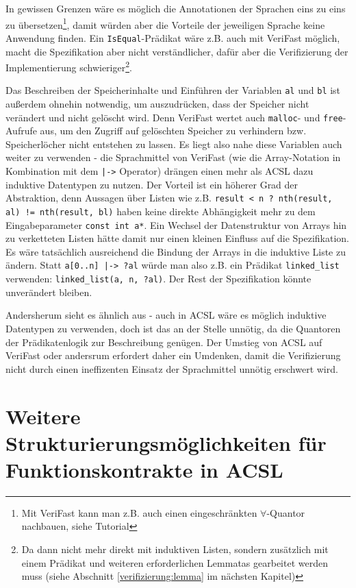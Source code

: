 In gewissen Grenzen wäre es möglich die Annotationen der Sprachen eins zu eins zu übersetzen\footnote{Mit
VeriFast kann man z.B. auch einen eingeschränkten \(\forall\)-Quantor nachbauen, siehe Tutorial\cite[Kap. 17]{jacobs-tutorial}},
damit würden aber die Vorteile der jeweiligen Sprache keine Anwendung finden. Ein \lstinline{IsEqual}-Prädikat wäre z.B.
auch mit VeriFast möglich, macht die Spezifikation aber nicht verständlicher, dafür aber die Verifizierung
der Implementierung schwieriger\footnote{Da dann nicht mehr direkt mit induktiven Listen, sondern zusätzlich
mit einem Prädikat und weiteren erforderlichen Lemmatas gearbeitet werden muss (siehe Abschnitt
\ref{verifizierung:lemma} im nächsten Kapitel)}.

Das Beschreiben der Speicherinhalte und Einführen der Variablen  \lstinline{al} und \lstinline{bl} ist außerdem
ohnehin notwendig, um auszudrücken, dass der Speicher nicht verändert und nicht gelöscht wird. Denn VeriFast wertet
auch \lstinline{malloc}- und \lstinline{free}-Aufrufe aus, um den Zugriff auf gelöschten Speicher zu verhindern bzw.
Speicherlöcher nicht entstehen zu lassen.
Es liegt also nahe diese Variablen auch weiter zu verwenden - die Sprachmittel von VeriFast (wie die Array-Notation in Kombination mit dem
\lstinline{|->} Operator) drängen einen mehr als ACSL dazu induktive Datentypen zu nutzen.
Der Vorteil ist ein höherer Grad der Abstraktion, denn Aussagen über Listen wie z.B.
\lstinline{result < n ? nth(result, al) != nth(result, bl)} haben keine direkte Abhängigkeit mehr zu
dem Eingabeparameter \lstinline{const int a*}. Ein Wechsel der Datenstruktur von Arrays
hin zu verketteten Listen hätte damit nur einen kleinen Einfluss auf die Spezifikation. Es wäre tatsächlich 
ausreichend die Bindung der Arrays in die induktive Liste zu ändern. Statt \lstinline{a[0..n] |-> ?al} würde man also
z.B. ein Prädikat \lstinline{linked_list} verwenden: \lstinline{linked_list(a, n, ?al)}. Der Rest der 
Spezifikation könnte unverändert bleiben.

Andersherum sieht es ähnlich aus - auch in ACSL wäre es möglich induktive Datentypen zu verwenden, doch
ist das an der Stelle unnötig, da die Quantoren der Prädikatenlogik zur Beschreibung genügen. 
Der Umstieg von ACSL auf VeriFast oder andersrum erfordert daher ein Umdenken, damit die Verifizierung 
nicht durch einen ineffizenten Einsatz der Sprachmittel unnötig erschwert wird.



\section{Weitere Strukturierungsmöglichkeiten für Funktionskontrakte in ACSL}
\label{sec:design-by-contract:behaviors}

